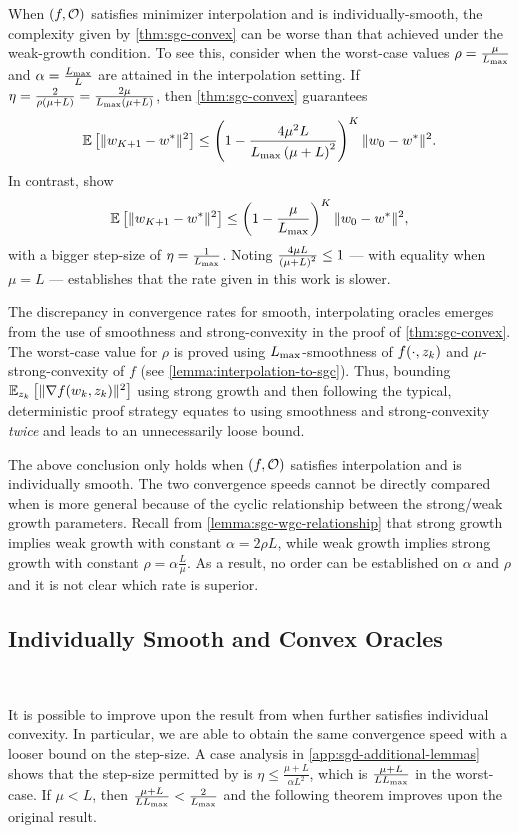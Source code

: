 When \( \rbr{f, \oracle{}} \) satisfies minimizer interpolation and \oracle{} is individually-smooth, the complexity given by \autoref{thm:sgc-convex} can be worse than that achieved under the weak-growth condition.
To see this, consider when the worst-case values \( \sgc = \frac{\mu}{\Lmax} \) and \( \wgc = \frac{\Lmax}{L} \) are attained in the interpolation setting. 
If \( \eta = \frac{2}{\sgc \rbr{\mu + L}} = \frac{2 \mu}{\Lmax\rbr{\mu + L}} \), then \autoref{thm:sgc-convex} guarantees  
\[ \E\sbr{\norm{\w_{K+1} - \wopt}^2} \leq \rbr{1 - \frac{4 \mu^2 L }{\Lmax \rbr{\mu + L}^2}}^K \norm{\w_0 - \wopt}^2. \]
In contrast, \citet[Theorem 5]{vaswani2019fast} show 
\[ \E\sbr{\norm{\w_{K+1} - \wopt}^2} \leq \rbr{1 - \frac{\mu}{\Lmax}}^K \norm{\w_0 - \wopt}^2, \]
with a bigger step-size of \( \eta = \frac{1}{\Lmax} \).
Noting \( \frac{4 \mu L}{\rbr{\mu + L}^2} \leq 1 \) --- with equality when \( \mu = L \) --- establishes that the rate given in this work is slower.

The discrepancy in convergence rates for smooth, interpolating oracles emerges from the use of smoothness and strong-convexity in the proof of \autoref{thm:sgc-convex}.
The worst-case value for \( \rho \) is proved using \( \Lmax \)-smoothness of \( f(\cdot, \zk) \) and \( \mu \)-strong-convexity of \( f \) (see \autoref{lemma:interpolation-to-sgc}).
Thus, bounding \( \Ek\sbr{\norm{\grad(\wk, \zk)}^2} \) using strong growth and then following the typical, deterministic proof strategy equates to using smoothness and strong-convexity \emph{twice} and leads to an unnecessarily loose bound.

The above conclusion only holds when \( \rbr{f, \oracle} \) satisfies interpolation and \oracle{} is individually smooth. 
The two convergence speeds cannot be directly compared when \oracle{} is more general because of the cyclic relationship between the strong/weak growth parameters. 
Recall from \autoref{lemma:sgc-wgc-relationship} that strong growth implies weak growth with constant \( \alpha = 2 \rho L \), while weak growth implies strong growth with constant \( \rho = \alpha \frac{L}{\mu} \).
As a result, no order can be established on \( \alpha \) and \( \rho \) and it is not clear which rate is superior.

\subsection{Individually Smooth and Convex Oracles}~\label{sec:sgd-sgc-ind-convex}

It is possible to improve upon the result from \citet{vaswani2019fast} when \oracle{} further satisfies individual convexity.
In particular, we are able to obtain the same convergence speed with a looser bound on the step-size.
A case analysis in \autoref{app:sgd-additional-lemmas} shows that the step-size permitted by \citet[Theorem 5]{vaswani2019fast} is \( \eta \leq \frac{\mu + L}{\alpha L^2} \), which is \( \frac{\mu + L}{L \Lmax}\) in the worst-case.
If \( \mu < L \), then \( \frac{\mu + L}{L \Lmax} < \frac{2}{\Lmax} \) and the following theorem improves upon the original result. 


